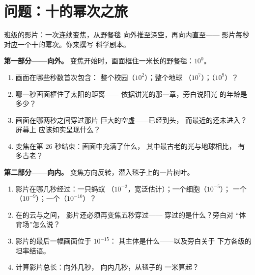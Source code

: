 \section{问题：十的幂次之旅}

\begin{problem}\label{pb:g9:atoms-to-galaxies:1}
班级的影片：一次连续变焦，从野餐毯
向外推至深空，再向内直至——
影片每秒对应一个十的幂次。你来撰写
科学剧本。

\medskip\noindent\textbf{第一部分——向外。}
变焦开始时，画面框住一米长的野餐毯：$10^{0}$。
\begin{enumerate}
  \item 画面在哪些秒数首次包含：
        整个校园（$10^{2}$）；整个地球
        （$10^{7}$）；（$10^{9}$）？
  \item 哪一秒画面框住了太阳的距离——
        依据讲光的那一章，旁白说阳光
        的年龄是多少？
  \item 画面在哪两秒之间穿过那片
        巨大的空虚——已经到头，
        而最近的还未进入？屏幕上
        应该如实呈现什么？
  \item 变焦在第 $26$ 秒结束：画面中充满了什么，
        其中最古老的光与地球相比，
        有多古老？
\end{enumerate}

\medskip\noindent\textbf{第二部分——向内。}
变焦方向反转，潜入毯子上的一片树叶。
\begin{enumerate}[resume]
  \item 影片在哪几秒经过：一只蚂蚁
        （$10^{-2}$，宽泛估计）；一个细胞（$10^{-5}$）；
        一个（$10^{-9}$）；一个（$10^{-10}$）？
  \item 在的云与之间，
        影片还必须再变焦五秒穿过——
        穿过的是什么？旁白对
        “体育场”怎么说？
  \item 影片的最后一幅画面位于 $10^{-15}$：
        其主体是什么——以及旁白关于
        下方各级的坦率结语。
  \item 计算影片总长：向外几秒，
        向内几秒，从毯子的
        一米算起？
\end{enumerate}


\end{problem}
